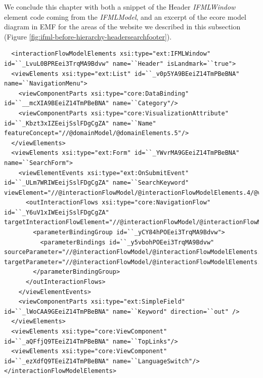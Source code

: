\newpage
We conclude this chapter with both a snippet of the Header \textit{IFMLWindow} element code coming from the \textit{IFMLModel}, and an excerpt of the ecore model diagram in EMF for the areas of the website we described in this subsection (Figure \ref{fig:ifml-before-hierarchy-headersearchfooter}).

\vspace{0.5cm}
\lstset{language=XML}
\begin{lstlisting} 
  <interactionFlowModelElements xsi:type="ext:IFMLWindow" id=``_LvuL0BPREei3TrqMA9Bdvw" name=``Header" isLandmark=``true">
  <viewElements xsi:type="ext:List" id=``_v0p5YA9BEeiZ14TmPBeBNA" name=``NavigationMenu">
    <viewComponentParts xsi:type="core:DataBinding" id=``__mcXIA9BEeiZ14TmPBeBNA" name=``Category"/>
    <viewComponentParts xsi:type="core:VisualizationAttribute" id=``_Kbzt3xIZEeijSslFDgCgZA" name=``Name" featureConcept="//@domainModel/@domainElements.5"/>
  </viewElements>
  <viewElements xsi:type="ext:Form" id=``_YWvrMA9GEeiZ14TmPBeBNA" name=``SearchForm">
    <viewElementEvents xsi:type="ext:OnSubmitEvent" id=``_ULm7WRIWEeijSslFDgCgZA" name=``SearchKeyword" viewElement="//@interactionFlowModel/@interactionFlowModelElements.4/@viewElements.1">
      <outInteractionFlows xsi:type="core:NavigationFlow" id=``_Y6uV1xIWEeijSslFDgCgZA" targetInteractionFlowElement="//@interactionFlowModel/@interactionFlowModelElements.3">
        <parameterBindingGroup id=``_yCY84hPOEei3TrqMA9Bdvw">
          <parameterBindings id=``_y5vbohPOEei3TrqMA9Bdvw" sourceParameter="//@interactionFlowModel/@interactionFlowModelElements.4/@viewElements.1/@viewComponentParts.0" targetParameter="//@interactionFlowModel/@interactionFlowModelElements.3/@parameters.0"/>
        </parameterBindingGroup>
      </outInteractionFlows>
    </viewElementEvents>
    <viewComponentParts xsi:type="ext:SimpleField" id=``_lWoCAA9GEeiZ14TmPBeBNA" name=``Keyword" direction=``out" />
  </viewElements>
  <viewElements xsi:type="core:ViewComponent" id=``_aQFfjQ9TEeiZ14TmPBeBNA" name=``TopLinks"/>
  <viewElements xsi:type="core:ViewComponent" id=``_ezXdfQ9TEeiZ14TmPBeBNA" name=``LanguageSwitch"/>
</interactionFlowModelElements>
\end{lstlisting}
\vspace{0.5cm}


